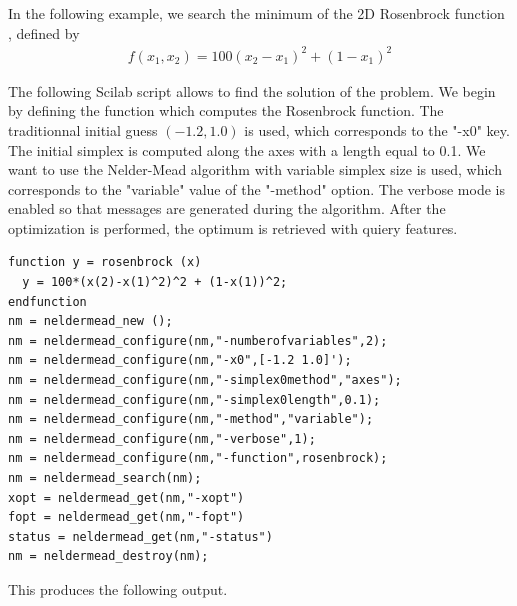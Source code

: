 In the following example, we search the minimum of the 2D Rosenbrock function \cite{citeulike:1903787}, 
defined by
\begin{eqnarray}
f(x_1,x_2) = 100(x_2 - x_1)^2 + (1-x_1)^2
\end{eqnarray}

The following Scilab script allows to find the solution of the problem. 
We begin by defining the function  which computes the Rosenbrock function. 
The traditionnal initial guess $(-1.2 , 1.0)$ is used, which corresponds 
to the "-x0" key. The initial simplex is computed along 
the axes with a length equal to 0.1. We want to use the Nelder-Mead algorithm with variable simplex size 
is used, which corresponds to the "variable" value of the "-method" option. 
The verbose mode is enabled so that messages are generated during the algorithm. 
After the optimization is performed, the optimum is retrieved with quiery features.

\lstset{language=Scilab}
\lstset{numbers=left}
\lstset{basicstyle=\footnotesize}
\lstset{keywordstyle=\bfseries}
\begin{lstlisting}
function y = rosenbrock (x)
  y = 100*(x(2)-x(1)^2)^2 + (1-x(1))^2;
endfunction
nm = neldermead_new ();
nm = neldermead_configure(nm,"-numberofvariables",2);
nm = neldermead_configure(nm,"-x0",[-1.2 1.0]');
nm = neldermead_configure(nm,"-simplex0method","axes");
nm = neldermead_configure(nm,"-simplex0length",0.1);
nm = neldermead_configure(nm,"-method","variable");
nm = neldermead_configure(nm,"-verbose",1);
nm = neldermead_configure(nm,"-function",rosenbrock);
nm = neldermead_search(nm);
xopt = neldermead_get(nm,"-xopt")
fopt = neldermead_get(nm,"-fopt")
status = neldermead_get(nm,"-status")
nm = neldermead_destroy(nm);
\end{lstlisting}

This produces the following output.

